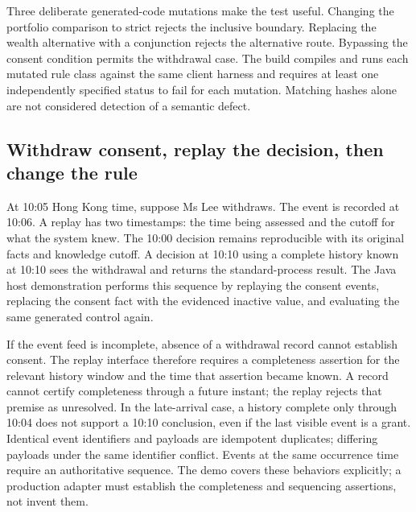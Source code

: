 
Three deliberate generated-code mutations make the test useful. Changing the
portfolio comparison to strict rejects the inclusive boundary. Replacing the
wealth alternative with a conjunction rejects the alternative route. Bypassing
the consent condition permits the withdrawal case. The build compiles and runs
each mutated rule class against the same client harness and requires at least
one independently specified status to fail for each mutation. Matching hashes
alone are not considered detection of a semantic defect.

\subsection{Withdraw consent, replay the decision, then change the rule}
\label{merge:P-01b-complete-dry-run:06}


At 10:05 Hong Kong time, suppose Ms Lee withdraws. The event is recorded at
10:06. A replay has two timestamps: the time being assessed and the cutoff for
what the system knew. The 10:00 decision remains reproducible with its original
facts and knowledge cutoff. A decision at 10:10 using a complete history known
at 10:10 sees the withdrawal and returns the standard-process result.
The Java host demonstration performs this sequence by replaying the consent
events, replacing the consent fact with the evidenced inactive value, and
evaluating the same generated control again.

If the event feed is incomplete, absence of a withdrawal record cannot establish
consent. The replay interface therefore requires a completeness assertion for
the relevant history window and the time that assertion became known. A record cannot certify completeness
through a future instant; the replay rejects that premise as unresolved. In the
late-arrival case, a history complete only through 10:04 does not support a
10:10 conclusion, even if the last visible event is a grant. Identical event
identifiers and payloads are idempotent duplicates; differing payloads under
the same identifier conflict. Events at the same occurrence time require an
authoritative sequence. The demo covers these behaviors explicitly; a production
adapter must establish the completeness and sequencing assertions, not invent
them.

